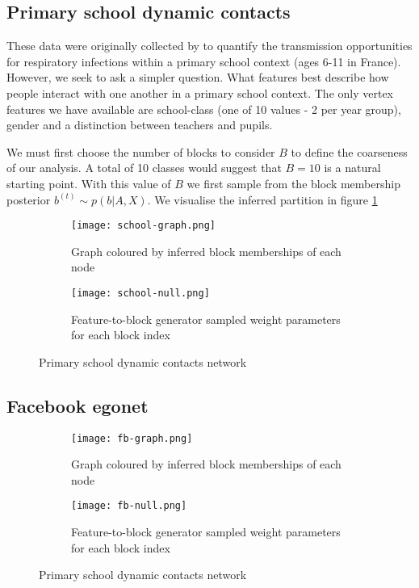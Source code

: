\subsection{Primary school dynamic contacts}

These data were originally collected by \citet{schools} to quantify the transmission opportunities for respiratory infections within a primary school context (ages 6-11 in France). However, we seek to ask a simpler question. What features best describe how people interact with one another in a primary school context. The only vertex features we have available are school-class (one of 10 values - 2 per year group), gender and a distinction between teachers and pupils.

We must first choose the number of blocks to consider $B$ to define the coarseness of our analysis. A total of 10 classes would suggest that $B=10$ is a natural starting point. With this value of $B$ we first sample from the block membership posterior $b^{(t)} \sim p(b | A, X)$. We visualise the inferred partition in figure \ref{fig:school-graph}

\begin{figure}[!h]
	\centering
	\begin{subfigure}{0.45\linewidth}
		\centering
		\texttt{[image: school-graph.png]}
		\caption{Graph coloured by inferred block memberships of each node}
		\label{fig:school-graph}
	\end{subfigure}
	\hfill
	\begin{subfigure}{0.45\linewidth}
		\centering
		\texttt{[image: school-null.png]}
		\caption{Feature-to-block generator sampled weight parameters for each block index}
		\label{fig:school-null}
	\end{subfigure}
	\caption{Primary school dynamic contacts network}
\end{figure}


\subsection{Facebook egonet}

\begin{figure}[!h]
	\centering
	\begin{subfigure}{0.45\linewidth}
		\centering
		\texttt{[image: fb-graph.png]}
		\caption{Graph coloured by inferred block memberships of each node}
		\label{fig:fb-graph}
	\end{subfigure}
	\hfill
	\begin{subfigure}{0.45\linewidth}
		\centering
		\texttt{[image: fb-null.png]}
		\caption{Feature-to-block generator sampled weight parameters for each block index}
		\label{fig:fb-null}
	\end{subfigure}
	\caption{Primary school dynamic contacts network}
\end{figure}


